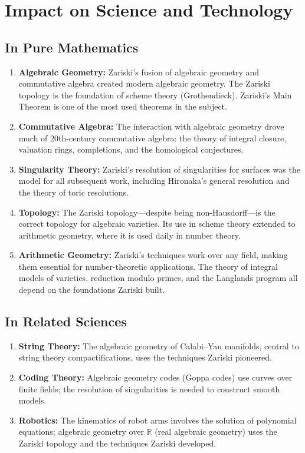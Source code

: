 \section{Impact on Science and Technology}

\subsection{In Pure Mathematics}

\begin{enumerate}
    \item \textbf{Algebraic Geometry:} Zariski's fusion of algebraic geometry and commutative algebra created modern algebraic geometry. The Zariski topology is the foundation of scheme theory (Grothendieck). Zariski's Main Theorem is one of the most used theorems in the subject.
    \item \textbf{Commutative Algebra:} The interaction with algebraic geometry drove much of 20th-century commutative algebra: the theory of integral closure, valuation rings, completions, and the homological conjectures.
    \item \textbf{Singularity Theory:} Zariski's resolution of singularities for surfaces was the model for all subsequent work, including Hironaka's general resolution and the theory of toric resolutions.
    \item \textbf{Topology:} The Zariski topology---despite being non-Hausdorff---is the correct topology for algebraic varieties. Its use in scheme theory extended to arithmetic geometry, where it is used daily in number theory.
    \item \textbf{Arithmetic Geometry:} Zariski's techniques work over any field, making them essential for number-theoretic applications. The theory of integral models of varieties, reduction modulo primes, and the Langlands program all depend on the foundations Zariski built.
\end{enumerate}

\subsection{In Related Sciences}

\begin{enumerate}
    \item \textbf{String Theory:} The algebraic geometry of Calabi--Yau manifolds, central to string theory compactifications, uses the techniques Zariski pioneered.
    \item \textbf{Coding Theory:} Algebraic geometry codes (Goppa codes) use curves over finite fields; the resolution of singularities is needed to construct smooth models.
    \item \textbf{Robotics:} The kinematics of robot arms involves the solution of polynomial equations; algebraic geometry over $\mathbb{R}$ (real algebraic geometry) uses the Zariski topology and the techniques Zariski developed.
\end{enumerate}


